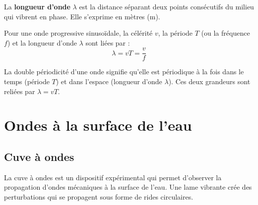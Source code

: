 \begin{definition}
La \textbf{longueur d'onde} $\lambda$ est la distance séparant deux points consécutifs du milieu qui vibrent en phase. Elle s'exprime en mètres (\si{\metre}).
\end{definition}

\begin{loi}
Pour une onde progressive sinusoïdale, la célérité $v$, la période $T$ (ou la fréquence $f$) et la longueur d'onde $\lambda$ sont liées par :
\[
\boxed{\lambda = v T = \frac{v}{f}}
\]
\end{loi}

\begin{illus}
\end{illus}

\begin{aretenir}
La double périodicité d'une onde signifie qu'elle est périodique à la fois dans le temps (période $T$) et dans l'espace (longueur d'onde $\lambda$). Ces deux grandeurs sont reliées par $\lambda = vT$.
\end{aretenir}

\section{Ondes à la surface de l'eau}

\subsection{Cuve à ondes}

La cuve à ondes est un dispositif expérimental qui permet d'observer la propagation d'ondes mécaniques à la surface de l'eau. Une lame vibrante crée des perturbations qui se propagent sous forme de rides circulaires.


